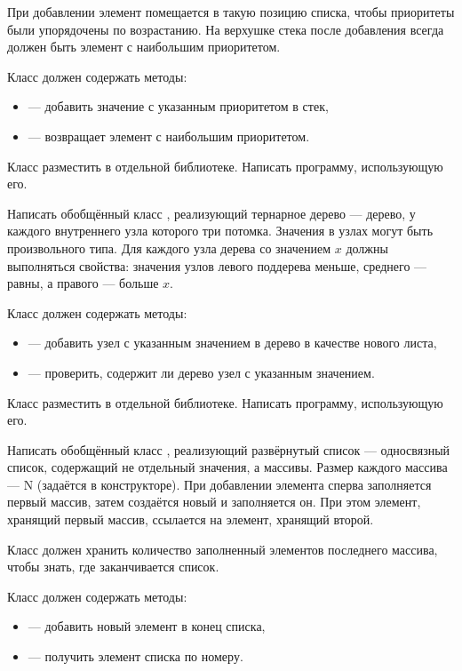 При добавлении элемент помещается в такую позицию списка, чтобы
приоритеты были упорядочены по возрастанию. На верхушке стека после
добавления всегда должен быть элемент с наибольшим приоритетом.

Класс должен содержать методы:
\begin{itemize}
\item {} — добавить значение с указанным приоритетом в стек,
\item {} — возвращает элемент с наибольшим приоритетом.
\end{itemize}

Класс разместить в отдельной библиотеке. Написать программу,
использующую его.

\task Написать обобщённый класс , реализующий
тернарное дерево — дерево, у каждого
внутреннего узла которого три потомка. Значения в узлах могут быть
произвольного типа. Для каждого узла дерева со значением $x$ должны
выполняться свойства: значения узлов левого поддерева меньше, среднего
— равны, а правого — больше $x$.

Класс должен содержать методы:
\begin{itemize}
\item {} — добавить узел с указанным значением в дерево в
  качестве нового листа,
\item {} — проверить, содержит ли дерево узел с указанным
  значением.
\end{itemize}

Класс разместить в отдельной библиотеке. Написать программу,
использующую его.

\task Написать обобщённый класс , реализующий
развёрнутый список — односвязный список,
содержащий не отдельный значения, а массивы. Размер каждого массива —
N (задаётся в конструкторе). При добавлении элемента сперва
заполняется первый массив, затем создаётся новый и заполняется он. При
этом элемент, хранящий первый массив, ссылается на элемент, хранящий
второй.

Класс должен хранить количество заполненный элементов последнего
массива, чтобы знать, где заканчивается список.

Класс должен содержать методы:
\begin{itemize}
\item {} — добавить новый элемент в конец списка,
\item {} — получить элемент списка по номеру.
\end{itemize}

